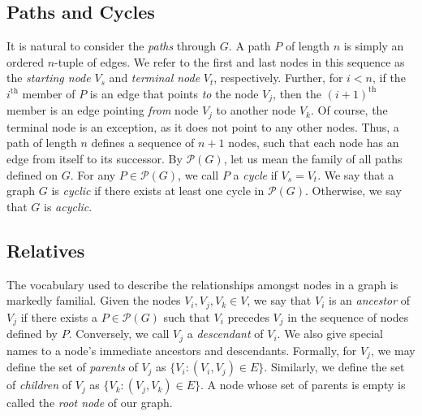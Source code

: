 \documentclass[12pt,twoside]{reedthesis}
\begin{document}
	\subsection*{Paths and Cycles}
	It is natural to consider the {\em paths} through $G$. A path $P$ of length $n$ is simply an ordered $n$-tuple of edges. 
	We refer to the first and last nodes in this sequence as the {\em starting node} $V_s$ and {\em terminal node} $V_t$, respectively. 
	 Further, for $i < n$, if the $i^{\text{th}}$ member of $P$ is an edge that points {\em to} the node $V_j$, then the $(i+1)^{\text{th}}$ member is an edge pointing {\em from} node $V_j$ to another node $V_k$. 
	 Of course, the terminal node is an exception, as it does not point to any other nodes. 
	 Thus, a path of length $n$ defines a sequence of $n+1$ nodes, such that each node has an edge from itself to its successor. 
	 By $\mathcal{P}(G)$, let us mean the family of all paths defined on $G$. For any $P \in \mathcal{P}(G)$, we call $P$ a {\em cycle} if $V_s = V_t$. We say that a graph $G$ is {\em cyclic} if there exists at least one cycle in $\mathcal{P}(G)$. Otherwise, we say that $G$ is {\em acyclic}.
	
	\subsection*{Relatives}
	The vocabulary used to describe the relationships amongst nodes in a graph is markedly familial. Given the nodes $V_i, V_j, V_k \in V$, we say that $V_i$ is an {\em ancestor} of $V_j$ if there exists a $P \in \mathcal{P}(G)$ such that $V_i$ precedes $V_j$ in the sequence of nodes defined by $P$. Conversely, we call $V_j$ a {\em descendant} of $V_i$. We also give special names to a node's immediate ancestors and descendants. Formally, for $V_j$, we may define the set of {\em parents} of $V_j$ as $\{V_i : (V_i,V_j) \in E \}$. Similarly, we define the set of {\em children} of $V_j$ as $\{V_k : (V_j, V_k) \in E\}$. A node whose set of parents is empty is called the {\em root node} of our graph.
	
\end{document}
